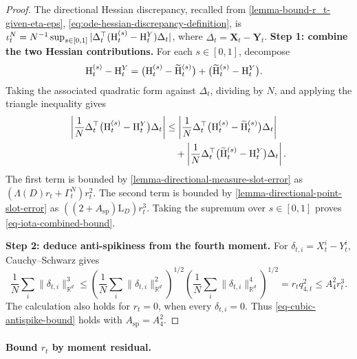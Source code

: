 \begin{proof}
The directional Hessian discrepancy, recalled from
\cref{lemma-bound-r_t-given-eta-eps},
\eqref{eq:ode-hessian-discrepancy-definition}, is
$\iota_t^N=N^{-1}\sup_{s\in[0,1]}
 |\Delta_t^\top(\mathrm{H}_t^{(s)}-\mathrm{H}_t^Y)\Delta_t|$,
where $\Delta_t=\mathbf X_t-\mathbf Y_t$.
\noindent\textbf{Step 1: combine the two Hessian contributions.}
For each \(s\in[0,1]\), decompose
\begin{align}
    \mathrm{H}_t^{(s)}-
    \mathrm{H}_t^Y
    &=
    \bigl(
        \mathrm{H}_t^{(s)}-
        \widetilde{\mathrm{H}}_t^{(s)}
    \bigr)
    +
    \bigl(
        \widetilde{\mathrm{H}}_t^{(s)}-
        \mathrm{H}_t^Y
    \bigr).
\end{align}
Taking the associated quadratic form against \(\Delta_t\), dividing by \(N\), and applying the triangle inequality gives
\begin{align}
    \left|
    \frac1N\Delta_t^\top
    \bigl(\mathrm{H}_t^{(s)}-\mathrm{H}_t^Y\bigr)
    \Delta_t
    \right|
    &\le
    \left|
    \frac1N\Delta_t^\top
    \bigl(
        \mathrm{H}_t^{(s)}-
        \widetilde{\mathrm{H}}_t^{(s)}
    \bigr)
    \Delta_t
    \right|\\
    &\quad+
    \left|
    \frac1N\Delta_t^\top
    \bigl(
        \widetilde{\mathrm{H}}_t^{(s)}-
        \mathrm{H}_t^Y
    \bigr)
    \Delta_t
    \right|.
\end{align}
The first term is bounded by \cref{lemma-directional-measure-slot-error} as
\((\Lambda(D)r_t+\Gamma_t^N)r_t^2\). The second term is bounded by
\cref{lemma-directional-point-slot-error} as
\(((2+A_{\mathrm{sp}})\mathrm L_D)r_t^3\). Taking the supremum over
\(s\in[0,1]\) proves \cref{eq-iota-combined-bound}.

\par\noindent\textbf{Step 2: deduce anti-spikiness from the fourth moment.}
For $\delta_{t,i}=X_t^i-Y_t^i$, Cauchy--Schwarz gives
\[
 \frac1N\sum_i\|\delta_{t,i}\|_{\mathbb R^d}^3
 \le\left(\frac1N\sum_i\|\delta_{t,i}\|_{\mathbb R^d}^2\right)^{1/2}
     \left(\frac1N\sum_i\|\delta_{t,i}\|_{\mathbb R^d}^4\right)^{1/2}
 =r_tq_{4,t}^2\le A_4^2r_t^3.
\]
The calculation also holds for $r_t=0$, when every $\delta_{t,i}=0$.
Thus \eqref{eq-cubic-antispike-bound} holds with $A_{\mathrm{sp}}=A_4^2$.
\end{proof}

\paragraph{Bound $r_t$ by moment residual.}

